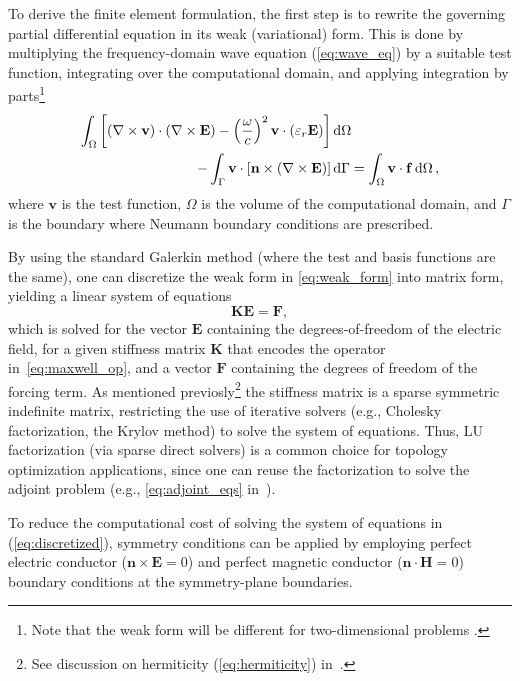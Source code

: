  To derive the finite element formulation, the first step is to rewrite the governing partial differential equation in its weak (variational) form. This is done by multiplying the frequency-domain wave equation (\eqref{eq:wave_eq}) by a suitable test function, integrating over the computational domain, and applying integration by parts\footnote{Note that the weak form will be different for two-dimensional problems \cite{ownpub0, ownpub2}.}
    \begin{align}\label{eq:weak_form}
        \int_\Omega \left[ \left( \nabla \times \mathbf{v} \right) \cdot \left( \nabla \times \mathbf{E} \right)- \left(\frac{\omega}{c}\right)^2 \mathbf{v}\cdot(\varepsilon_r \mathbf{E})\right]& \mathop{}\!\text{d} \Omega \nonumber \\ 
 - \int_{\Gamma} \mathbf{v} \cdot \left[ \mathbf{n} \times \left( \nabla \times \mathbf{E} \right) \right]& \mathop{}\!\text{d} \Gamma 
 = \int_\Omega \mathbf{v} \cdot \mathbf{f} \mathop{}\!\text{d} \Omega\,,
    \end{align}
 where $\mathbf{v}$ is the test function, $\Omega$ is the volume of the computational domain, and $\Gamma$ is the boundary where Neumann boundary conditions
 are prescribed. 
 
 By using
 the standard Galerkin method (where the test and basis functions are the same),
 one can discretize the weak form in \eqref{eq:weak_form} 
 into matrix form, yielding a linear system of equations
    \begin{equation}\label{eq:discretized}
 \mathbf{K} \mathbf{E} = \mathbf{F},
    \end{equation}
 which is solved for the vector $\mathbf{E}$ containing the degrees-of-freedom of the electric field, for a given stiffness matrix $\mathbf{K}$ that encodes the operator 
 in~\eqref{eq:maxwell_op}, and a 
 vector $\mathbf{F}$ containing the degrees of freedom of the forcing term. 
 As mentioned previosly\footnote{See discussion on hermiticity (\eqref{eq:hermiticity})
 in~.} the stiffness matrix is a sparse symmetric indefinite matrix,
 restricting the use of iterative solvers
 (e.g., Cholesky factorization, the Krylov method) to solve the system of equations.
 Thus, LU factorization (via sparse direct solvers) is
 a common choice for topology optimization applications, since one can reuse the factorization to solve
 the adjoint problem (e.g., \eqref{eq:adjoint_eqs} in~). 
 
 To reduce the computational cost of solving the system of equations in (\eqref{eq:discretized}), symmetry conditions can be applied by employing perfect electric conductor ($\mathbf{n} \times \mathbf{E}=0$) and perfect
 magnetic
 conductor ($\mathbf{n} \cdot \mathbf{H}=0$) boundary conditions at the symmetry-plane boundaries.

